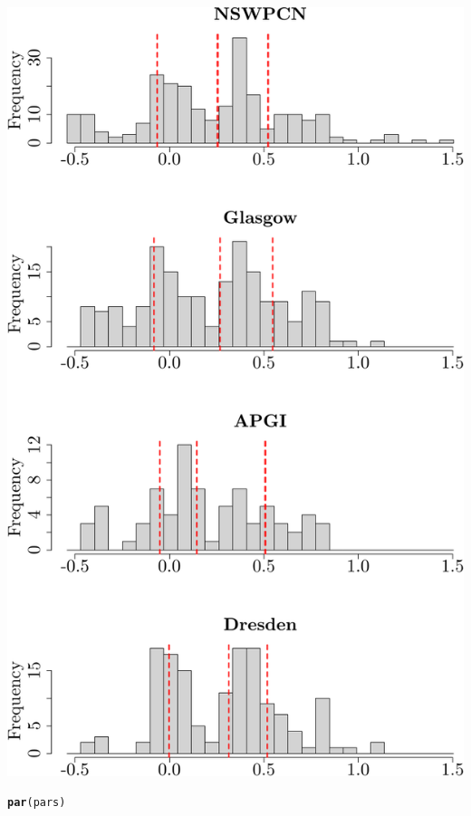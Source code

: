 \documentclass{article}\usepackage[]{graphicx}\usepackage[]{color}
\makeatletter
\def\maxwidth{ %
  \ifdim\Gin@nat@width>\linewidth
    \linewidth
  \else
    \Gin@nat@width
  \fi
}
\newcommand{\hlstd}[1]{\textcolor[rgb]{0.345,0.345,0.345}{#1}}%
\newcommand{\hlkwd}[1]{\textcolor[rgb]{0.737,0.353,0.396}{\textbf{#1}}}%
\newenvironment{kframe}{%
 \def\at@end@of@kframe{}%
 \ifinner\ifhmode%
  \def\at@end@of@kframe{\end{minipage}}%
  \begin{minipage}{\columnwidth}%
 \fi\fi%
 \def\FrameCommand##1{\hskip\@totalleftmargin \hskip-\fboxsep
 \colorbox{shadecolor}{##1}\hskip-\fboxsep
     \hskip-\linewidth \hskip-\@totalleftmargin \hskip\columnwidth}%
 \MakeFramed {\advance\hsize-\width
   \@totalleftmargin\z@ \linewidth\hsize
   \@setminipage}}%
 {\par\unskip\endMakeFramed%
 \at@end@of@kframe}
\newenvironment{knitrout}{}{} %
\makeatother
\begin{document}
\begin{knitrout}
{\centering \includegraphics[width=\maxwidth]{figure/07-score-hists-1} 

}


\begin{kframe}\begin{alltt}
\hlkwd{par}\hlstd{(pars)}
\end{alltt}
\end{kframe}
\end{knitrout}
\end{document}
